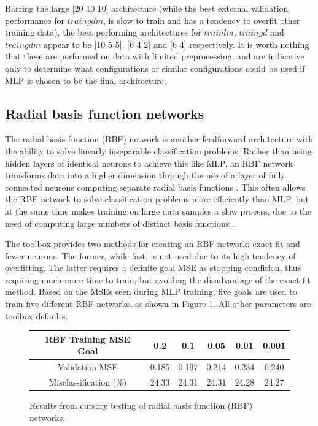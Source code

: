 \documentclass[10pt, oneside]{article}
\begin{document}
Barring the large [20 10 10] architecture (while the best external validation performance for $traingdm$, is slow to train and has a tendency to overfit other training data), the best performing architectures for $trainlm$, $traingd$ and $traingdm$ appear to be [10 5 5], [6 4 2] and [6 4] respectively. It is worth nothing that these are performed on data with limited preprocessing, and are indicative only to determine what configurations or similar configurations could be used if MLP is chosen to be the final architecture.

\subsection{Radial basis function networks}

The radial basis function (RBF) network is another feedforward architecture with the ability to solve linearly inseparable classification problems. Rather than using hidden layers of identical neurons to achieve this like MLP, an RBF network transforms data into a higher dimension through the use of a layer of fully connected neurons computing separate radial basis functions \cite{rbf-lecture}. This often allows the RBF network to solve classification problems more efficiently than MLP, but at the same time makes training on large data samples a slow process, due to the need of computing large numbers of distinct basis functions \cite[p. 260]{haykin2008}.

The toolbox provides two methods for creating an RBF network: exact fit and fewer neurons. The former, while fast, is not used due to its high tendency of overfitting. The latter requires a definite goal MSE as stopping condition, thus requiring much more time to train, but avoiding the disadvantage of the exact fit method. Based on the MSEs seen during MLP training, five goals are used to train five different RBF networks, as shown in Figure \ref{fig:rbf-testing}. All other parameters are toolbox defaults.

\begin{figure}[h]
\begin{center}
\fontsize{9}{11}\selectfont
\begin{tabular}{|c|c|c|c|c|c|}
\hline 
RBF Training MSE Goal & 0.2 & 0.1 & 0.05 & 0.01 & 0.001 \\ \hline \hline 
Validation MSE & 0.185 & 0.197 & 0.214 & 0.234 & 0.240 \\ \hline 
Misclassification (\%) & 24.33 & 24.31 & 24.31 & 24.28 & 24.27 \\ \hline 
\end{tabular}
\end{center}
\caption{\label{fig:rbf-testing} Results from cursory testing of radial basis function (RBF) networks.}
\end{figure}
\end{document}

